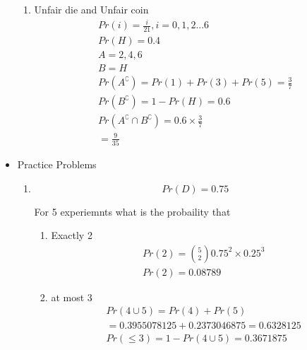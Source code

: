 \documentclass{report}
\begin{document}
\begin{itemize}
\begin{enumerate}
            \item Unfair die and Unfair coin
                \begin{gather}
                    Pr(i) = \frac{i}{21}, i = 0, 1, 2 ... 6\\ 
                    Pr(H) = 0.4\\
                    A = {2, 4, 6}\\
                    B = {H}\\
                    Pr(A^{\complement}) = Pr(1) + Pr(3) + Pr(5) = \frac{3}{7}\\
                    Pr(B^{\complement}) = 1 - Pr(H) = 0.6\\
                    Pr(A^{\complement} \cap B^{\complement}) = 0.6 \times \frac{3}{7}\\
                    = \frac{9}{35}
                \end{gather}
        \end{enumerate}
        \pagebreak
    \item Practice Problems
        \begin{enumerate}
            \item 
                \begin{displaymath}
                Pr(D) = 0.75
                \end{displaymath}

                For 5 experiemnts what is the probaility
                that
                \begin{enumerate}
                    \item Exactly 2
                        \begin{gather}
                            Pr(2) = \binom{5}{2} 0.75^{2} \times 0.25^{3}\\
                            Pr(2) = 0.08789
                        \end{gather}
                    \item at most 3
                        \begin{gather}
                            Pr(4 \cup 5) = Pr(4) + Pr(5)\\ 
                            = 0.3955078125 + 0.2373046875
                            = 0.6328125\\
                            Pr(\le 3) = 1 - Pr(4 \cup 5) = 0.3671875
                        \end{gather}
                \end{enumerate}


\end{enumerate}
\end{itemize}
\end{document}
